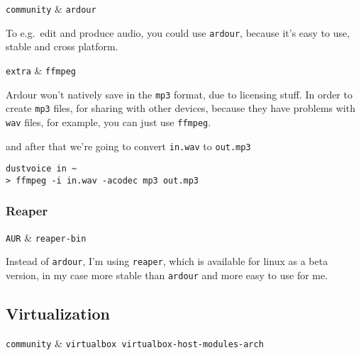 \documentclass[10pt]{dustdoc}
\begin{document}
\begin{pkgtable}
    \texttt{community} & \texttt{ardour} \\
\end{pkgtable}

To e.g.\ edit and produce audio, you could use \texttt{ardour}, because it’s easy to use, stable and cross platform.

\begin{NOTE}
    \begin{pkgtable}
        \texttt{extra} & \texttt{ffmpeg} \\
    \end{pkgtable}

    Ardour won’t natively save in the \texttt{mp3} format, due to licensing stuff.
    In order to create \texttt{mp3} files, for sharing with other devices, because they have problems with \texttt{wav} files, for example, you can just use \texttt{ffmpeg}.

    and after that we’re going to convert \texttt{in.wav} to \texttt{out.mp3}

    \begin{verbatim}
dustvoice in ~
> ffmpeg -i in.wav -acodec mp3 out.mp3
    \end{verbatim}

\end{NOTE}


\subsubsection{Reaper}%
\label{sec:reaper}

\begin{pkgtable}
    \texttt{AUR} & \texttt{reaper-bin} \\
\end{pkgtable}

Instead of \texttt{ardour}, I’m using \texttt{reaper}, which is available for linux as a beta version, in my case more stable than \texttt{ardour} and more easy to use for me.

\subsection{Virtualization}%
\label{sec:virtualization}

\begin{pkgtable}
    \texttt{community} & \texttt{virtualbox virtualbox-host-modules-arch} \\
\end{pkgtable}
\end{document}
